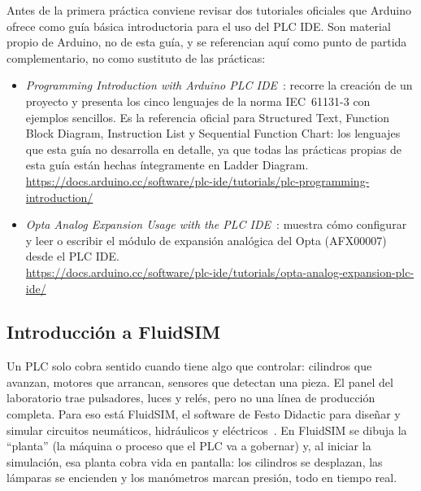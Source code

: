\documentclass[12pt,a4paper]{article}
\begin{document}
Antes de la primera práctica conviene revisar dos tutoriales oficiales que
Arduino ofrece como guía básica introductoria para el uso del PLC IDE. Son
material propio de Arduino, no de esta guía, y se referencian aquí como
punto de partida complementario, no como sustituto de las prácticas:

\begin{itemize}
    \item \textit{Programming Introduction with Arduino PLC
    IDE}~\cite{plcintro}: recorre la creación de un proyecto y presenta
    los cinco lenguajes de la norma IEC~61131-3 con ejemplos sencillos. Es
    la referencia oficial para Structured Text, Function Block Diagram,
    Instruction List y Sequential Function Chart: los lenguajes que esta
    guía no desarrolla en detalle, ya que todas las prácticas propias de
    esta guía están hechas íntegramente en Ladder Diagram.\\
    \url{https://docs.arduino.cc/software/plc-ide/tutorials/plc-programming-introduction/}
    \item \textit{Opta Analog Expansion Usage with the PLC
    IDE}~\cite{optaanalogtut}: muestra cómo configurar y leer o escribir
    el módulo de expansión analógica del Opta (AFX00007) desde el PLC IDE.\\
    \url{https://docs.arduino.cc/software/plc-ide/tutorials/opta-analog-expansion-plc-ide/}
\end{itemize}

\subsection{Introducción a FluidSIM}
\label{subsec:intro_fluidsim}

Un PLC solo cobra sentido cuando tiene algo que controlar: cilindros que
avanzan, motores que arrancan, sensores que detectan una pieza. El panel del
laboratorio trae pulsadores, luces y relés, pero no una línea de producción
completa. Para eso está FluidSIM, el software de Festo Didactic para diseñar
y simular circuitos neumáticos, hidráulicos y eléctricos~\cite{fluidsim}. En
FluidSIM se dibuja la ``planta'' (la máquina o proceso que el PLC va a
gobernar) y, al iniciar la simulación, esa planta cobra vida en pantalla:
los cilindros se desplazan, las lámparas se encienden y los manómetros marcan
presión, todo en tiempo real.
\end{document}
